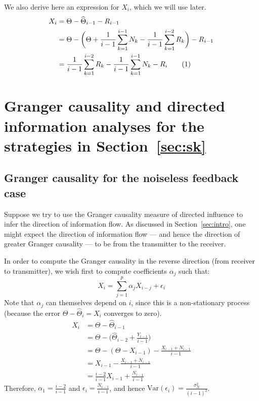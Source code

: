 \documentclass[conference]{IEEEtran}
\newcommand\numberthis{\stepcounter{equation}\tag{\theequation}}
\begin{document}
We also derive here an expression for $X_i$, which we will use later.
\begin{align*}
	X_i &= \Theta - \widehat\Theta_{i-1} - R_{i-1} \\
	&= \Theta - \bigg( \Theta + \frac{1}{i-1} \sum_{k=1}^{i-1} N_k - \frac{1}{i-1} \sum_{k=1}^{i-2} R_k \bigg) - R_{i-1} \\
	&= \frac{1}{i-1} \sum_{k=1}^{i-2} R_k - \frac{1}{i-1} \sum_{k=1}^{i-1} N_k - R_{i} \numberthis \label{eq:x_i-noisy}
\end{align*}

\section{Granger causality and directed information analyses for the strategies in Section~\ref{sec:sk}}
\label{sec:analytical-results}

\subsection{Granger causality for the noiseless feedback case}

Suppose we try to use the Granger causality measure of directed influence to infer the direction of information flow. As discussed in Section~\ref{sec:intro}, one might expect the direction of information flow --- and hence the direction of greater Granger causality --- to be from the transmitter to the receiver.

In order to compute the Granger causality in the reverse direction (from receiver to transmitter), we wish first to compute coefficients $\alpha_j$ such that:
\begin{equation*}
	X_i = \sum_{j=1}^{p}{\alpha_j X_{i-j}} + \epsilon_i
\end{equation*}
Note that $\alpha_j$ can themselves depend on $i$, since this is a non-stationary process (because the error $\Theta-\widehat{\Theta}_i = X_i$ converges to zero).
\begin{align*}
	X_i &= \Theta - \widehat\Theta_{i-1} \\
		&= \Theta - \big( \widehat\Theta_{i-2} + \frac{Y_{i-1}}{i-1} \big) \\
		&= \Theta - (\Theta - X_{i-1}) - \frac{X_{i-1} + N_{i-1}}{i-1} \\
		&= X_{i-1} - \frac{X_{i-1} + N_{i-1}}{i-1} \\
		&= \frac{i-2}{i-1} X_{i-1} + \frac{N_{i-1}}{i-1}
\end{align*}
Therefore, $\alpha_1 = \frac{i-2}{i-1}$ and $\epsilon_i = \frac{N_{i-1}}{i-1}$, and hence $\text{Var}(\epsilon_i) = \frac{\sigma_N^2}{(i-1)^2}$.
\end{document}
